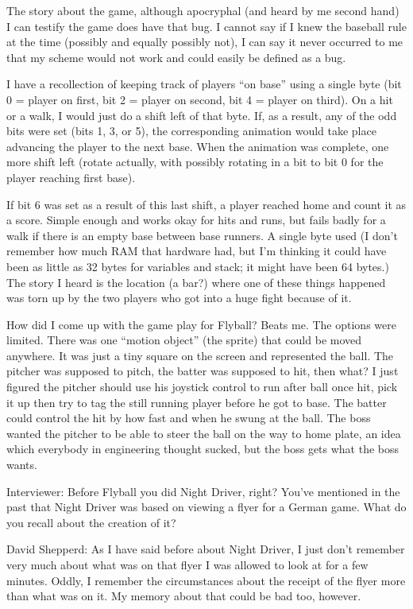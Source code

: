 The story about the game, although apocryphal (and heard by me second hand) I can testify the game does have that bug. I cannot say if I knew the baseball rule at the time (possibly and equally possibly not), I can say it never occurred to me that my scheme would not work and could easily be defined as a bug. 

I have a recollection of keeping track of players “on base” using a single byte (bit 0 = player on first, bit 2 = player on second, bit 4 = player on third). On a hit or a walk, I would just do a shift left of that byte. If, as a result, any of the odd bits were set (bits 1, 3, or 5), the corresponding animation would take place advancing the player to the next base. When the animation was complete, one more shift left (rotate actually, with possibly rotating in a bit to bit 0 for the player reaching first base). 

If bit 6 was set as a result of this last shift, a player reached home and count it as a score. Simple enough and works okay for hits and runs, but fails badly for a walk if there is an empty base between base runners. A single byte used (I don't remember how much RAM that hardware had, but I'm thinking it could have been as little as 32 bytes for variables and stack; it might have been 64 bytes.) The story I heard is the location (a bar?) where one of these things happened was torn up by the two players who got into a huge fight because of it.

How did I come up with the game play for Flyball? Beats me. The options were limited. There was one “motion object” (the sprite) that could be moved anywhere. It was just a tiny square on the screen and represented the ball. The pitcher was supposed to pitch, the batter was supposed to hit, then what? I just figured the pitcher should use his joystick control to run after ball once hit, pick it up then try to tag the still running player before he got to base. The batter could control the hit by how fast and when he swung at the ball. The boss wanted the pitcher to be able to steer the ball on the way to home plate, an idea which everybody in engineering thought sucked, but the boss gets what the boss wants.

\textcolor{interviewer}{Interviewer:} Before Flyball you did Night Driver, right? You’ve mentioned in the past that Night Driver was based on viewing a flyer for a German game. What do you recall about the creation of it?

\textcolor{interviewee} {David Shepperd:} As I have said before about Night Driver, I just don't remember very much about what was on that flyer I was allowed to look at for a few minutes. Oddly, I remember the circumstances about the receipt of the flyer more than what was on it. My memory about that could be bad too, however. 

